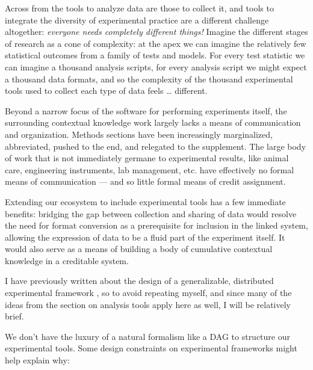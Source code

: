 Across from the tools to analyze data are those to collect it, and tools
to integrate the diversity of experimental practice are a different
challenge altogether: \emph{everyone needs completely different things!}
Imagine the different stages of research as a cone of complexity: at the
apex we can imagine the relatively few statistical outcomes from a
family of tests and models. For every test statistic we can imagine a
thousand analysis scripts, for every analysis script we might expect a
thousand data formats, and so the complexity of the thousand
experimental tools used to collect each type of data feels \ldots{}
different.

Beyond a narrow focus of the software for performing experiments itself,
the surrounding contextual knowledge work largely lacks a means of
communication and organization. Methods sections have been increasingly
marginalized, abbreviated, pushed to the end, and relegated to the
supplement. The large body of work that is not immediately germane to
experimental results, like animal care, engineering instruments, lab
management, etc. have effectively no formal means of communication ---
and so little formal means of credit assignment.

Extending our ecosystem to include experimental tools has a few
immediate benefits: bridging the gap between collection and sharing of
data would resolve the need for format conversion as a prerequisite for
inclusion in the linked system, allowing the expression of data to be a
fluid part of the experiment itself. It would also serve as a means of
building a body of cumulative contextual knowledge in a creditable
system.

I have previously written about the design of a generalizable,
distributed experimental framework \citep{saundersAutopilotAutomatingBehavioral2019} , so to avoid repeating
myself, and since many of the ideas from the section on analysis tools
apply here as well, I will be relatively brief.

We don't have the luxury of a natural formalism like a DAG to structure
our experimental tools. Some design constraints on experimental
frameworks might help explain why:

